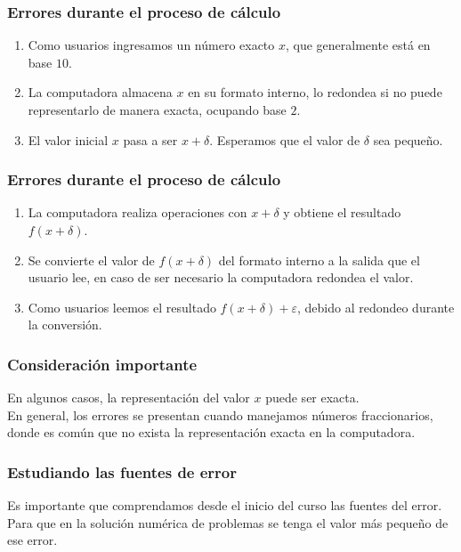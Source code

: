 \documentclass[12pt]{beamer}
\begin{document}
\begin{frame}
\frametitle{Errores durante el proceso de cálculo}
\begin{enumerate}[<+->]
\item Como usuarios ingresamos un número exacto $x$, que generalmente está en base $10$.
\item La computadora almacena $x$ en su formato interno, lo redondea si no puede representarlo de manera exacta, ocupando base $2$.
\item El valor inicial $x$ pasa a ser $x + \delta$. \pause Esperamos que el valor de $\delta$ sea pequeño.
\seti
\end{enumerate}
\end{frame}
\begin{frame}
\frametitle{Errores durante el proceso de cálculo}
\begin{enumerate}[<+->]
\conti
\item La computadora realiza operaciones con $x + \delta$ y obtiene el resultado $f (x + \delta)$.
\item Se convierte el valor de $f (x + \delta)$ del formato interno a la salida que el usuario lee, en caso de ser necesario la computadora redondea el valor.
\item Como usuarios leemos el resultado $f (x + \delta) + \varepsilon$, debido al redondeo durante la conversión.
\end{enumerate}
\end{frame}
\begin{frame}
\frametitle{Consideración importante}
En algunos casos, la representación del valor $x$ puede ser exacta.
\\
\bigskip
\pause
En general, los errores se presentan cuando manejamos números fraccionarios, donde es común que no exista la representación exacta en la computadora.
\end{frame}
\begin{frame}
\frametitle{Estudiando las fuentes de error}
Es importante que comprendamos desde el inicio del curso las fuentes del error.
\\
\bigskip
\pause
Para que en la solución numérica de problemas se tenga el valor más pequeño de ese error.
\end{frame}
\end{document}
